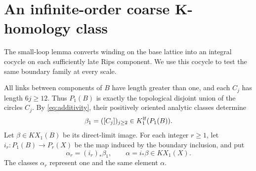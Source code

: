 \section{An infinite-order coarse K-homology class}\label{sec:persistence}

The small-loop lemma converts winding on the base lattice into an integral
cocycle on each sufficiently late Rips component. We use this cocycle to
test the same boundary family at every scale.

All links between components of $B$ have length greater than one, and each
$C_j$ has length $6j\ge12$. Thus $P_1(B)$ is exactly the topological disjoint
union of the circles $C_j$. By \eqref{eq:additivity}, their positively
oriented analytic classes determine
\[
 \beta_1=([C_j])_{j\ge2}\in K_1^{\mathrm{lf}}(P_1(B)).
\]
Let $\beta\in KX_1(B)$ be its direct-limit image. For each integer $r\ge1$,
let $i_r:P_1(B)\to P_r(X)$ be the map induced by the boundary inclusion,
and put
\[
 \alpha_r=(i_r)_*\beta_1,\qquad \alpha=i_*\beta\in KX_1(X).
\]
The classes $\alpha_r$ represent one and the same element $\alpha$.

